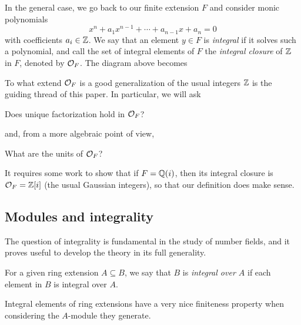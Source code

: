 In the general case, we go back to our finite extension $F$ and consider monic polynomials
\[
	x^n + a_1x^{n-1} + \cdots + a_{n-1}x + a_n = 0
\]
with coefficients $a_i\in\mathbb{Z}$. We say that an element $y\in F$ is \emph{integral} if it solves such a polynomial, and call the set of integral elements of $F$ the \emph{integral closure} of $\mathbb{Z}$ in $F$, denoted by $\mathcal{O}_F$. The diagram above becomes

\begin{center}
\end{center}

To what extend $\mathcal{O}_F$ is a good generalization of the usual integers $\mathbb{Z}$ is the guiding thread of this paper. In particular, we will ask

\begin{quest}
	Does unique factorization hold in $\mathcal{O}_F$?
\end{quest}

and, from a more algebraic point of view,

\begin{quest}
	What are the units of $\mathcal{O}_F$?
\end{quest}

It requires some work to show that if $F=\mathbb{Q}(i)$, then its integral closure is $\mathcal{O}_F=\mathbb{Z}[i]$ (the usual Gaussian integers), so that our definition does make sense.

\subsection{Modules and integrality}

The question of integrality is fundamental in the study of number fields, and it proves useful to develop the theory in its full generality.

For a given ring extension $A\subseteq B$, we say that $B$ is \emph{integral over $A$} if each element in $B$ is integral over $A$.

Integral elements of ring extensions have a very nice finiteness property when considering the $A$-module they generate.

